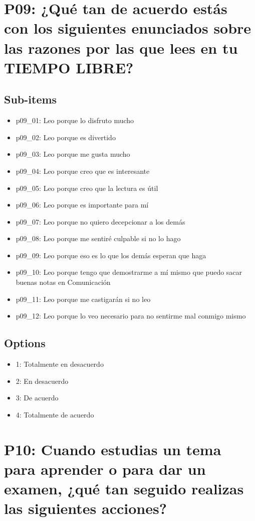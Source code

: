 \documentclass[11pt]{article}
\begin{document}
\section*{P09: ¿Qué tan de acuerdo estás con los siguientes enunciados sobre las razones por las que lees en tu TIEMPO LIBRE?}
\subsection*{Sub-items}
\begin{itemize}[leftmargin=*]
  \item p09\_01: Leo porque lo disfruto mucho
  \item p09\_02: Leo porque es divertido
  \item p09\_03: Leo porque me gusta mucho
  \item p09\_04: Leo porque creo que es interesante
  \item p09\_05: Leo porque creo que la lectura es útil
  \item p09\_06: Leo porque es importante para mí
  \item p09\_07: Leo porque no quiero decepcionar a los demás
  \item p09\_08: Leo porque me sentiré culpable si no lo hago
  \item p09\_09: Leo porque eso es lo que los demás esperan que haga
  \item p09\_10: Leo porque tengo que demostrarme a mí mismo que puedo sacar buenas notas en Comunicación
  \item p09\_11: Leo porque me castigarán si no leo
  \item p09\_12: Leo porque lo veo necesario para no sentirme mal conmigo mismo
\end{itemize}
\subsection*{Options}
\begin{itemize}[leftmargin=*]
  \item 1: Totalmente en desacuerdo
  \item 2: En desacuerdo
  \item 3: De acuerdo
  \item 4: Totalmente de acuerdo
\end{itemize}
\bigskip
\section*{P10: Cuando estudias un tema para aprender o para dar un examen, ¿qué tan seguido realizas las siguientes acciones?}
\end{document}
